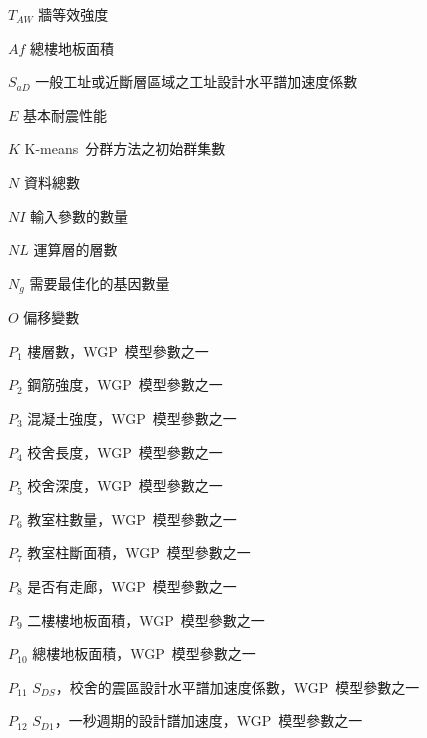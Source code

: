 \begin{SymEntry}
\item[$T_{AW}$]
牆等效強度

\item[$Af$]
總樓地板面積

\item[$S_{aD}$]
一般工址或近斷層區域之工址設計水平譜加速度係數

\item[$E$]
基本耐震性能

\item[$K$]
K-means~分群方法之初始群集數

\item[$N$]
資料總數

\item[$NI$]
輸入參數的數量

\item[$NL$]
運算層的層數

\item[$N_g$]
需要最佳化的基因數量

\item[$O$]
偏移變數

\item[$P_1$]
樓層數，WGP~模型參數之一

\item[$P_2$]
鋼筋強度，WGP~模型參數之一

\item[$P_3$]
混凝土強度，WGP~模型參數之一

\item[$P_4$]
校舍長度，WGP~模型參數之一

\item[$P_5$]
校舍深度，WGP~模型參數之一

\item[$P_6$]
教室柱數量，WGP~模型參數之一

\item[$P_7$]
教室柱斷面積，WGP~模型參數之一

\item[$P_8$]
是否有走廊，WGP~模型參數之一

\item[$P_9$]
二樓樓地板面積，WGP~模型參數之一

\item[$P_{10}$]
總樓地板面積，WGP~模型參數之一

\item[$P_{11}$]
$S_{DS}$，校舍的震區設計水平譜加速度係數，WGP~模型參數之一

\item[$P_{12}$]
$S_{D1}$，一秒週期的設計譜加速度，WGP~模型參數之一


\end{SymEntry}
